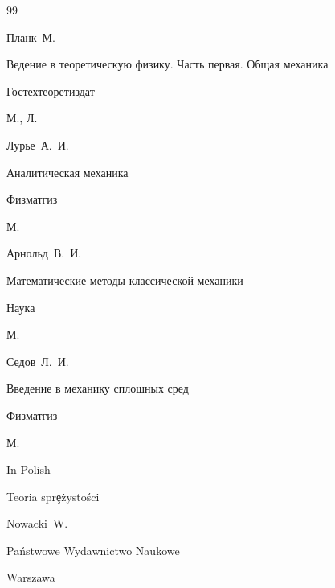 \begin{thebibliography}{99}




\by Планк~М.

\book Ведение в теоретическую физику. Часть первая. Общая механика


\publ Гостехтеоретиздат

\publaddr М., Л.





\by Лурье~А.~И.

\book Аналитическая механика


\publ Физматгиз

\publaddr М.





\by Арнольд~В.~И.

\book Математические методы классической механики


\publ Наука

\publaddr М.






\by Седов~Л.~И.

\book Введение в механику сплошных сред


\publ Физматгиз

\publaddr М.






\lang In Polish

\book Teoria spr\c{e}\.{z}ysto\'sci

\by Nowacki~W. 

\publaddr Pa\'nstwowe Wydawnictwo Naukowe

\publ Warszawa




\end{thebibliography}
